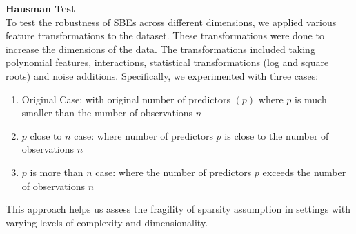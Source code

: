 \textbf{Hausman Test}\\
To test the robustness of SBEs across different dimensions, we applied various feature transformations to the dataset.  These transformations were done to increase the dimensions of the data. The  transformations included taking polynomial features, interactions, statistical transformations (log and square roots) and noise additions. Specifically, we experimented with three cases: 
\begin{enumerate}
    \item Original Case: with original number of predictors $(p)$ where $p$ is much smaller than the number of observations $n$
    \item $p$ close to $n$ case: where number of predictors $p$ is close to the number of observations $n$
    \item $p$ is more than $n$ case: where the number of predictors $p$ exceeds the number of observations $n$
\end{enumerate}
This approach helps us assess the fragility of sparsity assumption in settings with varying levels of complexity and dimensionality.